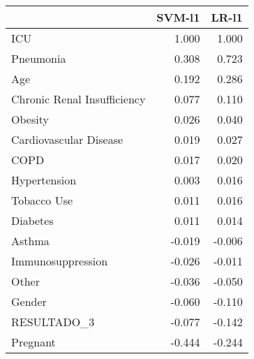 \begin{tabular}{lrr}
\toprule
{} &  SVM-l1 &  LR-l1 \\
\midrule
ICU                         &   1.000 &  1.000 \\
Pneumonia                   &   0.308 &  0.723 \\
Age                         &   0.192 &  0.286 \\
Chronic Renal Insufficiency &   0.077 &  0.110 \\
Obesity                     &   0.026 &  0.040 \\
Cardiovascular Disease      &   0.019 &  0.027 \\
COPD                        &   0.017 &  0.020 \\
Hypertension                &   0.003 &  0.016 \\
Tobacco Use                 &   0.011 &  0.016 \\
Diabetes                    &   0.011 &  0.014 \\
Asthma                      &  -0.019 & -0.006 \\
Immunosuppression           &  -0.026 & -0.011 \\
Other                       &  -0.036 & -0.050 \\
Gender                      &  -0.060 & -0.110 \\
RESULTADO\_3                 &  -0.077 & -0.142 \\
Pregnant                    &  -0.444 & -0.244 \\
\bottomrule
\end{tabular}
